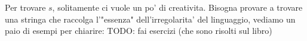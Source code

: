Per trovare $ s $, solitamente ci vuole un po' di creativita. Bisogna provare a trovare una stringa che raccolga l'"essenza" dell'irregolarita' del linguaggio, vediamo un paio di esempi per chiarire:
TODO: fai esercizi (che sono risolti sul libro)
